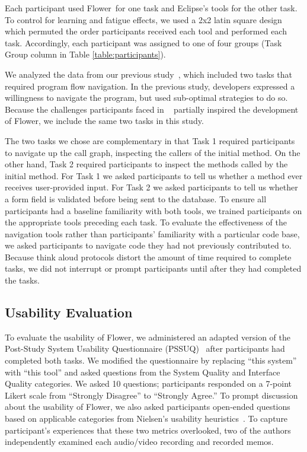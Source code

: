 \documentclass[conference]{IEEEtran}
\newcommand{\toolName}{Flower}
\begin{document}
Each participant used \toolName~for one task and Eclipse's tools for the other task.
To control for learning and fatigue effects, we used a 2x2 latin square design which permuted the order participants received each tool and performed each task. 
Accordingly, each participant was assigned to one of four groups (Task Group column in Table \ref{table:participants}).

We analyzed the data from our previous study~\cite{Smith2015}, which included two tasks that required program flow navigation.
In the previous study, developers expressed a willingness to navigate the program, but used sub-optimal strategies to do so.
Because the challenges participants faced in ~\cite{Smith2015} partially inspired the development of \toolName, we include the same two tasks in this study.

The two tasks we chose are complementary in that Task 1 required participants to navigate up the call graph, inspecting the callers of the initial method. 
On the other hand, Task 2 required participants to inspect the methods called by the initial method.
For Task 1 we asked participants to tell us whether a method ever receives user-provided input.
For Task 2 we asked participants to tell us whether a form field is validated before being sent to the database.
To ensure all participants had a baseline familiarity with both tools, we trained participants on the appropriate tools preceding each task. 
To evaluate the effectiveness of the navigation tools rather than participants' familiarity with a particular code base, we asked participants to navigate code they had not previously contributed to. 
Because think aloud protocols distort the amount of time required to complete tasks, we did not interrupt or prompt participants until after they had completed the tasks.


\subsection{Usability Evaluation}
\label{UsabilityMethodology}
To evaluate the usability of \toolName, we administered an adapted version of the Post-Study System Usability Questionnaire (PSSUQ)~\cite{Lewis95ibmcomputer} after participants had completed both tasks. We modified the questionnaire by replacing ``this system'' with ``this tool'' and asked questions from the System Quality and Interface Quality categories. We asked 10 questions; participants responded on a 7-point Likert scale from ``Strongly Disagree'' to ``Strongly Agree.'' 	
To prompt discussion about the usability of \toolName, we also asked participants open-ended questions based on applicable categories from Nielsen's usability heuristics~\cite{Nielsen1992}.
To capture participant's experiences that these two metrics overlooked, two of the authors independently examined each audio/video recording and recorded memos. 
\end{document}
